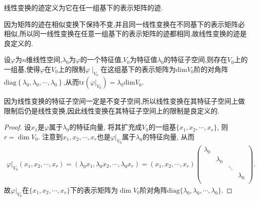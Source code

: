 \documentclass[../../main.tex]{subfiles}%
\begin{document}
\begin{definition}[线性变换的迹]
线性变换的迹定义为它在任一组基下的表示矩阵的迹.
\end{definition}
\begin{note}
因为矩阵的迹在相似变换下保持不变,并且同一线性变换在不同基下的表示矩阵必相似,所以同一线性变换在任意一组基下的表示矩阵的迹都相同,故线性变换的迹是良定义的.
\end{note}

\begin{proposition}\label{proposition:线性变换在其特征子空间上的限制的表示矩阵及迹}
设$\varphi$为$n$维线性空间,$\lambda_0$为$\varphi$的一个特征值,$V_0$为特征值$\lambda_0$的特征子空间,则存在$V_0$上的一组基,使得$\varphi$在$V_0$上的限制$\varphi\mid_{V_0}$在这组基下的表示矩阵为$\mathrm{dim}V_0$阶的对角阵$\mathrm{diag}\left\{ \lambda _0,\lambda _0,\cdots ,\lambda _0 \right\}$,从而$\mathrm{tr}\left( \varphi |_{V_0} \right) =\lambda _0\mathrm{dim}V_0$.
\end{proposition}
\begin{remark}
因为线性变换的特征子空间一定是不变子空间,所以线性变换在其特征子空间上做限制后仍是线性变换,因此线性变换在其特征子空间上的限制是良定义的.
\end{remark}
\begin{proof}

设\(x_1\)是\(\varphi\)属于\(\lambda_0\)的特征向量, 将其扩充成\(V_0\)的一组基\(\{ x_1,x_2,\cdots ,x_r \}\), 则\(r = \dim V_0\).
注意到\(x_1,x_2,\cdots ,x_r\)也是\(\varphi|_{V_0}\)属于\(\lambda_0\)的特征向量, 从而
\begin{align*}
\varphi|_{V_0}( x_1,x_2,\cdots ,x_r )=(\lambda_0x_1,\lambda_0x_2,\cdots ,\lambda_0x_r)
=( x_1,x_2,\cdots ,x_r )\begin{pmatrix}
\lambda_0& & & \\
& \lambda_0& & \\
& & \ddots& \\
& & & \lambda_0\\
\end{pmatrix}.
\end{align*}
故\(\varphi|_{V_0}\)在\(\{ x_1,x_2,\cdots ,x_r \}\)下的表示矩阵为\(\dim V_0\)阶对角阵\(\mathrm{diag}\{ \lambda_0,\lambda_0,\cdots ,\lambda_0 \}\).

\end{proof}
\end{document}
